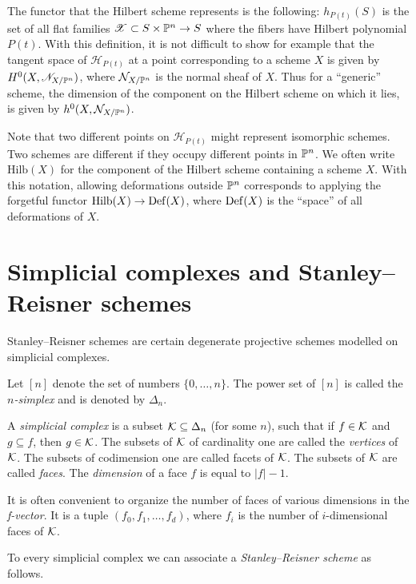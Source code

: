 The functor that the Hilbert scheme represents is the following: $h_{P(t)}(S)$ is the set of all flat families $\mathscr X \subset S \times \P^n  \to S$ where the fibers have Hilbert polynomial $P(t)$. With this definition, it is not difficult to show for example that the tangent space of $\mathscr H_{P(t)}$ at a point corresponding to a scheme $X$ is given by $H^0(X,\mathscr N_{X/\P^n})$, where $\mathcal N_{X/\P^n}$ is the normal sheaf of $X$. Thus for a ``generic'' scheme, the dimension of the component on the Hilbert scheme on which it lies, is given by $h^0(X,\mathcal N_{X/\P^n})$.

Note that two different points on $\mathscr H_{P(t)}$ might represent isomorphic schemes. Two schemes are different if they occupy different points in $\P^n$. We often write $\mathrm{Hilb}(X)$ for the component of the Hilbert scheme containing a scheme $X$. With this notation, allowing deformations outside $\P^n$ corresponds to applying the forgetful functor $\mathrm{Hilb}(X) \to \Def(X)$, where $\Def(X)$ is the ``space''   of all deformations of $X$.


\section{Simplicial complexes and Stanley--Reisner schemes}

Stanley--Reisner schemes are certain degenerate projective schemes modelled on simplicial complexes.

Let $[n]$ denote the set of numbers $\{0,\ldots,n \}$. The power set of $[n]$ is called the \emph{$n$-simplex} and is denoted by $\Delta_n$.

\begin{definition}
A \emph{simplicial complex} is a subset $\K \subseteq \Delta_n$ (for some $n$), such that if $f \in \K$ and $g \subseteq f$, then $g \in \K$. The subsets of $\K$ of cardinality one are called the \emph{vertices} of $\K$. The subsets of codimension one are called {facets} of $\K$. The subsets of $\K$ are called \emph{faces}. The \emph{dimension} of a face $f$ is equal to $|f| - 1$. 
\end{definition}

It is often convenient to organize the number of faces of various dimensions in the \emph{f-vector}. It is a tuple $(f_0,f_1,\ldots,f_d)$, where $f_i$ is the number of $i$-dimensional faces of $\K$.

To every simplicial complex we can associate a \emph{Stanley--Reisner scheme} as follows.

